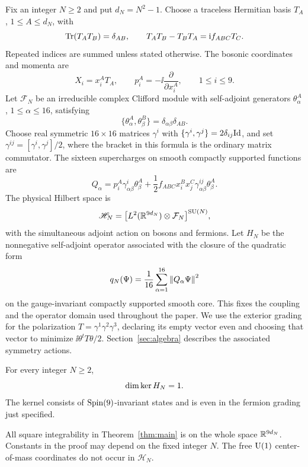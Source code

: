 Fix an integer \(N\ge2\) and put \(d_N=N^2-1\).
Choose a traceless Hermitian basis \(T_A\), \(1\le A\le d_N\), with
\[
\operatorname{Tr}(T_AT_B)=\delta_{AB},\qquad
T_AT_B-T_BT_A=\mathrm i f_{ABC}T_C.
\]
Repeated indices are summed unless stated otherwise.
The bosonic coordinates and momenta are
\[
X_i=x_i^AT_A,\qquad p_i^A=-\ii\frac{\partial}{\partial x_i^A},
\qquad 1\le i\le9.
\]
Let \(\mathcal F_N\) be an irreducible complex Clifford module with
self-adjoint generators \(\theta_\alpha^A\), \(1\le\alpha\le16\), satisfying
\[
\{\theta_\alpha^A,\theta_\beta^B\}
  =\delta_{\alpha\beta}\delta_{AB}.
\]
Choose real symmetric \(16\times16\) matrices \(\gamma^i\) with
\(\{\gamma^i,\gamma^j\}=2\delta_{ij}\mathrm{Id}\), and set
\(\gamma^{ij}=[\gamma^i,\gamma^j]/2\), where the bracket in this formula
is the ordinary matrix commutator. The sixteen supercharges on smooth
compactly supported functions are
\begin{equation}
Q_\alpha
 =p_i^A\gamma^i_{\alpha\beta}\theta_\beta^A
 +\frac12 f_{ABC}x_i^Bx_j^C
       \gamma^{ij}_{\alpha\beta}\theta_\beta^A.
\label{eq:model-charge}
\end{equation}
The physical Hilbert space is
\[
\mathscr H_N
 =\bigl[L^2(\mathbb R^{9d_N})\otimes\mathcal F_N\bigr]^{\operatorname{SU}(N)},
\]
with the simultaneous adjoint action on bosons and fermions. Let \(H_N\)
be the nonnegative self-adjoint operator associated with the closure of
the quadratic form
\begin{equation}
q_N(\Psi)=\frac1{16}\sum_{\alpha=1}^{16}\left\lVert Q_\alpha\Psi\right\rVert^2
\label{eq:model-form}
\end{equation}
on the gauge-invariant compactly supported smooth core. This fixes the
coupling and the operator domain used throughout the paper.
We use the exterior grading for the polarization
$T=\gamma^1\gamma^2\gamma^3$, declaring its empty vector even and
choosing that vector to minimize $\ii\theta^tT\theta/2$.
Section~\ref{sec:algebra} describes the associated symmetry actions.

\begin{theorem}\label{thm:main}
For every integer \(N\ge2\),
\[
\dim\operatorname{ker} H_N=1.
\]
The kernel consists of \(\operatorname{Spin}(9)\)-invariant states and is even in the
fermion grading just specified.
\end{theorem}

All square integrability in Theorem~\ref{thm:main} is on the whole
space \(\mathbb R^{9d_N}\). Constants in the proof may depend on the fixed
integer \(N\). The free \(\operatorname{U}(1)\) center-of-mass coordinates do not occur
in \(\mathscr H_N\).

